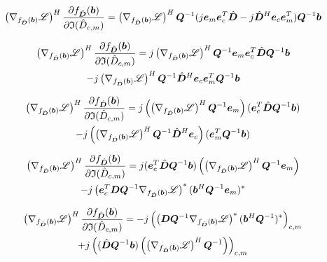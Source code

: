 \begin{appendices}
\begin{equation}
\left(\nabla_{f_{\hat{\bm{D}}}(\bm{b})} \mathscr{L}\right)^H\frac{\partial f_{\hat{\bm{D}}}(\bm{b})}{\partial \mathfrak{I}(\hat{D}_{c,m})} = \left(\nabla_{f_{\hat{\bm{D}}}(\bm{b})} \mathscr{L}\right)^H\bm{Q}^{-1}(j\bm{e}_m\bm{e}_c^T\hat{\bm{D}} - j\hat{\bm{D}}^H\bm{e}_c\bm{e}_m^T)\bm{Q}^{-1}\bm{b}
\end{equation}

\begin{multline}
\left(\nabla_{f_{\hat{\bm{D}}}(\bm{b})} \mathscr{L}\right)^H\frac{\partial f_{\hat{\bm{D}}}(\bm{b})}{\partial \mathfrak{I}(\hat{D}_{c,m})} = j\left(\nabla_{f_{\hat{\bm{D}}}(\bm{b})} \mathscr{L}\right)^H\bm{Q}^{-1}\bm{e}_m\bm{e}_c^T\hat{\bm{D}}\bm{Q}^{-1}\bm{b} \\- j\left(\nabla_{f_{\hat{\bm{D}}}(\bm{b})} \mathscr{L}\right)^H\bm{Q}^{-1}\hat{\bm{D}}^H\bm{e}_c\bm{e}_m^T\bm{Q}^{-1}\bm{b}
\end{multline}

\begin{multline}
\left(\nabla_{f_{\hat{\bm{D}}}(\bm{b})} \mathscr{L}\right)^H\frac{\partial f_{\hat{\bm{D}}}(\bm{b})}{\partial \mathfrak{I}(\hat{D}_{c,m})} = j\left(\left(\nabla_{f_{\hat{\bm{D}}}(\bm{b})} \mathscr{L}\right)^H\bm{Q}^{-1}\bm{e}_m\right)(\bm{e}_c^T\hat{\bm{D}}\bm{Q}^{-1}\bm{b}) \\- j\left(\left(\nabla_{f_{\hat{\bm{D}}}(\bm{b})} \mathscr{L}\right)^H\bm{Q}^{-1}\hat{\bm{D}}^H\bm{e}_c\right)(\bm{e}_m^T\bm{Q}^{-1}\bm{b})
\end{multline}

\begin{multline}
\left(\nabla_{f_{\hat{\bm{D}}}(\bm{b})} \mathscr{L}\right)^H\frac{\partial f_{\hat{\bm{D}}}(\bm{b})}{\partial \mathfrak{I}(\hat{D}_{c,m})} = j(\bm{e}_c^T\hat{\bm{D}}\bm{Q}^{-1}\bm{b})\left(\left(\nabla_{f_{\hat{\bm{D}}}(\bm{b})} \mathscr{L}\right)^H\bm{Q}^{-1}\bm{e}_m\right) \\- j\left(\bm{e}_c^T\bm{D}\bm{Q}^{-1}\nabla_{f_{\hat{\bm{D}}}(\bm{b})} \mathscr{L}\right)^*(\bm{b}^H\bm{Q}^{-1}\bm{e}_m)^*
\end{multline}


\begin{multline}
\left(\nabla_{f_{\hat{\bm{D}}}(\bm{b})} \mathscr{L}\right)^H\frac{\partial f_{\hat{\bm{D}}}(\bm{b})}{\partial \mathfrak{I}(\hat{D}_{c,m})} = -j\left(\left(\bm{D}\bm{Q}^{-1}\nabla_{f_{\hat{\bm{D}}}(\bm{b})} \mathscr{L}\right)^*(\bm{b}^H\bm{Q}^{-1})^*\right)_{c,m} \\+ j\left((\hat{\bm{D}}\bm{Q}^{-1}\bm{b})\left(\left(\nabla_{f_{\hat{\bm{D}}}(\bm{b})} \mathscr{L}\right)^H\bm{Q}^{-1}\right)\right)_{c,m}
\end{multline}




\end{appendices}
